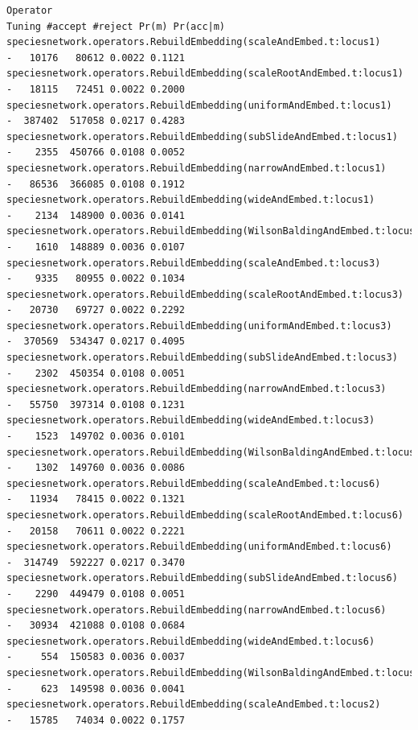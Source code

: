 \documentclass[11pt]{article}
\begin{document}
{\begin{verbatim}
Operator                                                                   Tuning #accept #reject Pr(m) Pr(acc|m)
speciesnetwork.operators.RebuildEmbedding(scaleAndEmbed.t:locus1)               -   10176   80612 0.0022 0.1121 
speciesnetwork.operators.RebuildEmbedding(scaleRootAndEmbed.t:locus1)           -   18115   72451 0.0022 0.2000 
speciesnetwork.operators.RebuildEmbedding(uniformAndEmbed.t:locus1)             -  387402  517058 0.0217 0.4283 
speciesnetwork.operators.RebuildEmbedding(subSlideAndEmbed.t:locus1)            -    2355  450766 0.0108 0.0052 
speciesnetwork.operators.RebuildEmbedding(narrowAndEmbed.t:locus1)              -   86536  366085 0.0108 0.1912 
speciesnetwork.operators.RebuildEmbedding(wideAndEmbed.t:locus1)                -    2134  148900 0.0036 0.0141 
speciesnetwork.operators.RebuildEmbedding(WilsonBaldingAndEmbed.t:locus1)       -    1610  148889 0.0036 0.0107 
speciesnetwork.operators.RebuildEmbedding(scaleAndEmbed.t:locus3)               -    9335   80955 0.0022 0.1034 
speciesnetwork.operators.RebuildEmbedding(scaleRootAndEmbed.t:locus3)           -   20730   69727 0.0022 0.2292 
speciesnetwork.operators.RebuildEmbedding(uniformAndEmbed.t:locus3)             -  370569  534347 0.0217 0.4095 
speciesnetwork.operators.RebuildEmbedding(subSlideAndEmbed.t:locus3)            -    2302  450354 0.0108 0.0051 
speciesnetwork.operators.RebuildEmbedding(narrowAndEmbed.t:locus3)              -   55750  397314 0.0108 0.1231 
speciesnetwork.operators.RebuildEmbedding(wideAndEmbed.t:locus3)                -    1523  149702 0.0036 0.0101 
speciesnetwork.operators.RebuildEmbedding(WilsonBaldingAndEmbed.t:locus3)       -    1302  149760 0.0036 0.0086 
speciesnetwork.operators.RebuildEmbedding(scaleAndEmbed.t:locus6)               -   11934   78415 0.0022 0.1321 
speciesnetwork.operators.RebuildEmbedding(scaleRootAndEmbed.t:locus6)           -   20158   70611 0.0022 0.2221 
speciesnetwork.operators.RebuildEmbedding(uniformAndEmbed.t:locus6)             -  314749  592227 0.0217 0.3470 
speciesnetwork.operators.RebuildEmbedding(subSlideAndEmbed.t:locus6)            -    2290  449479 0.0108 0.0051 
speciesnetwork.operators.RebuildEmbedding(narrowAndEmbed.t:locus6)              -   30934  421088 0.0108 0.0684 
speciesnetwork.operators.RebuildEmbedding(wideAndEmbed.t:locus6)                -     554  150583 0.0036 0.0037 
speciesnetwork.operators.RebuildEmbedding(WilsonBaldingAndEmbed.t:locus6)       -     623  149598 0.0036 0.0041 
speciesnetwork.operators.RebuildEmbedding(scaleAndEmbed.t:locus2)               -   15785   74034 0.0022 0.1757 

\end{verbatim}}
\end{document}
